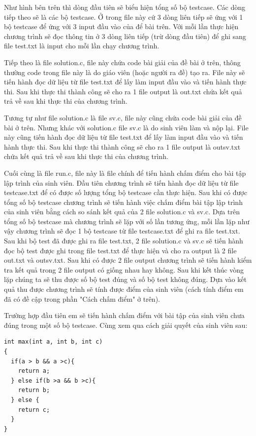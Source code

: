 \documentclass[12pt,a4paper]{report}
\begin{document}
Như hình bên trên thì dòng đầu tiên sẽ biểu hiện tổng số bộ testcase. Các dòng tiếp theo sẽ là các bộ testcase. Ở trong file này cứ 3 dòng liên tiếp sẽ ứng với 1 bộ testcase để ứng với 3 input đầu vào của để bài trên. Với mỗi lần thực hiện chương trình sẽ đọc thông tin ở 3 dòng liên tiếp (trừ dòng đầu tiên) để ghi sang file test.txt là input cho mỗi lần chạy chương trình.

Tiếp theo là file solution.c, file này chứa code bài giải của đề bài ở trên, thông thường code trong file này là do giáo viên (hoặc người ra đề) tạo ra. File này sẽ tiến hành đọc dữ liệu từ file test.txt để lấy làm input đầu vào và tiến hành thực thi. Sau khi thực thi thành công sẽ cho ra 1 file output là out.txt chứa kết quả trả về sau khi thực thi của chương trình.

Tương tự như file solution.c là file sv.c, file này cũng chứa code bài giải của đề bài ở trên. Nhưng khác với solution.c file sv.c là do sinh viên làm và nộp lại. File này cũng tiến hành đọc dữ liệu từ file test.txt để lấy làm input đầu vào và tiến hành thực thi. Sau khi thực thi thành công sẽ cho ra 1 file output là outsv.txt chứa kết quả trả về sau khi thực thi của chương trình.

Cuối cùng là file run.c, file này là file chính để tiến hành chấm điểm cho bài tập lập trình của sinh viên. Đầu tiên chương trình sẽ tiến hành đọc dữ liệu từ file testcase.txt để có được số lượng tổng bộ testcase cần thực hiện. Sau khi có được tổng số bộ testcase chương trình sẽ tiến hành việc chấm điểm bài tập lập trình của sinh viên bằng cách so sánh kết quả của 2 file solution.c và sv.c. Dựa trên tổng số bộ testcase mà chương trình sẽ lặp với số lần tương ứng, mỗi lần lặp như vậy chương trình sẽ đọc 1 bộ testcase từ file testcase.txt để ghi ra file test.txt. Sau khi bộ test đã được ghi ra file test.txt, 2 file solution.c và sv.c sẽ tiến hành đọc bộ test được ghi trong file test.txt để thực hiện và cho ra output là 2 file out.txt và outsv.txt. Sau khi có được 2 file output chương trình sẽ tiến hành kiểm tra kết quả trong 2 file output có giống nhau hay không. Sau khi kết thúc vòng lặp chúng ta sẽ thu được số bộ test đúng và số bộ test không đúng. Dựa vào kết quả thu được chương trình sẽ tính được điểm của sinh viên (cách tính điểm em đã có đề cập trong phần "Cách chấm điểm" ở trên).

Trường hợp đầu tiên em sẽ tiến hành chấm điểm với bài tập của sinh viên chưa đúng trong một số bộ testcase. Cùng xem qua cách giải quyết của sinh viên sau:

\begin{lstlisting}
int max(int a, int b, int c)
{
  if(a > b && a >c){   
    return a;
  } else if(b >a && b >c){
    return b;
  } else {
    return c;
  }
}
\end{lstlisting}
\end{document}
